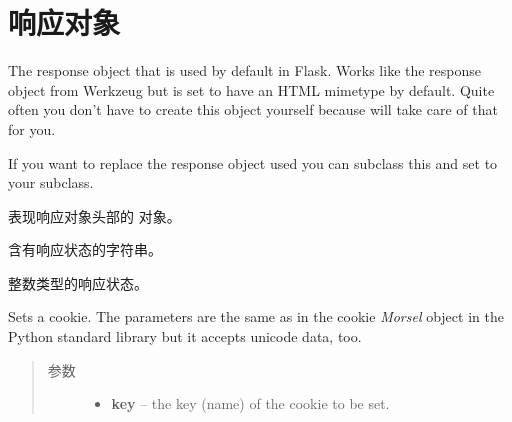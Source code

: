 \documentclass[a4paper,12pt]{sphinxmanual}
\begin{document}
\section{响应对象}
\label{api:id5}

\begin{fulllineitems}
\label{api:flask.Response}
The response object that is used by default in Flask.  Works like the
response object from Werkzeug but is set to have an HTML mimetype by
default.  Quite often you don't have to create this object yourself because
{\hyperref[api:flask.Flask.make_response]{}} will take care of that for you.

If you want to replace the response object used you can subclass this and
set {\hyperref[api:flask.Flask.response_class]{}} to your subclass.

\begin{fulllineitems}
\label{api:flask.Response.headers}
表现响应对象头部的  对象。

\end{fulllineitems}


\begin{fulllineitems}
\label{api:flask.Response.status}
含有响应状态的字符串。

\end{fulllineitems}


\begin{fulllineitems}
\label{api:flask.Response.status_code}
整数类型的响应状态。

\end{fulllineitems}


\begin{fulllineitems}
\label{api:flask.Response.set_cookie}
Sets a cookie. The parameters are the same as in the cookie \emph{Morsel}
object in the Python standard library but it accepts unicode data, too.
\begin{quote}\begin{description}
\item[{参数}] \leavevmode\begin{itemize}
\item {} 
\textbf{key} -- the key (name) of the cookie to be set.


\end{itemize}
\end{description}
\end{quote}
\end{fulllineitems}
\end{fulllineitems}
\end{document}

